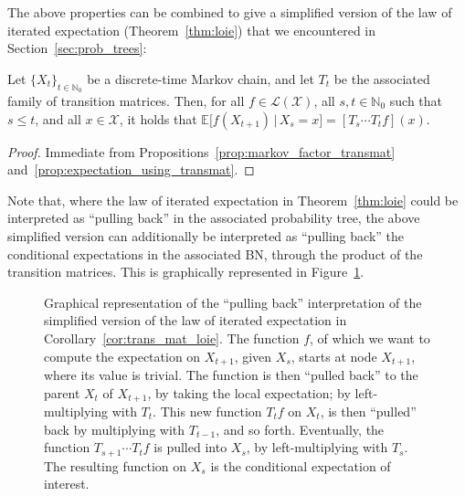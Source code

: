 \documentclass[graybox]{svmult}
\newcommand{\nats}{\mathbb{N}}
\newcommand{\natswith}{\nats_{0}}
\newcommand{\states}{\mathcal{X}}
\newcommand{\gambles}{\mathcal{L}}
\newcommand{\gamblesX}{\gambles(\states)}
\begin{document}
The above properties can be combined to give a simplified version of the law of iterated expectation (Theorem~\ref{thm:loie}) that we encountered in Section~\ref{sec:prob_trees}:
\begin{corollary}\label{cor:trans_mat_loie}
Let $\{X_t\}_{t\in\natswith}$ be a discrete-time Markov chain, and let $T_t$ be the associated family of transition matrices. Then, for all $f\in\gamblesX$, all $s,t\in\natswith$ such that $s\leq t$, and all $x\in\states$, it holds that $\mathbb{E}\bigl[f(X_{t+1})\,\vert\,X_s=x\bigr] = \left[T_s\cdots T_tf\right](x)$.
\end{corollary}
\begin{proof}
Immediate from Propositions~\ref{prop:markov_factor_transmat} and~\ref{prop:expectation_using_transmat}.
\end{proof}
Note that, where the law of iterated expectation in Theorem~\ref{thm:loie} could be interpreted as ``pulling back'' in the associated probability tree, the above simplified version can additionally be interpreted as ``pulling back'' the conditional expectations in the associated BN, through the product of the transition matrices. This is graphically represented in Figure~\ref{fig:example_loie_pgm}.
\begin{figure}
\centering
{}
\caption{Graphical representation of the ``pulling back'' interpretation of the simplified version of the law of iterated expectation in Corollary~\ref{cor:trans_mat_loie}. The function $f$, of which we want to compute the expectation on $X_{t+1}$, given $X_s$, starts at node $X_{t+1}$, where its value is trivial. The function is then ``pulled back'' to the parent $X_t$ of $X_{t+1}$, by taking the local expectation;  by left-multiplying with $T_t$. This new function $T_tf$ on $X_t$, is then ``pulled'' back by multiplying with $T_{t-1}$, and so forth. Eventually, the function $T_{s+1}\cdots T_tf$ is pulled into $X_s$, by left-multiplying with $T_s$. The resulting function on $X_s$ is the conditional expectation of interest.}
\label{fig:example_loie_pgm}
\end{figure}
\end{document}
